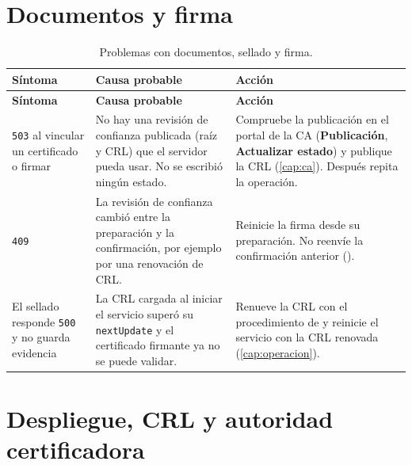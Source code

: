 \section{Documentos y firma}\label{sec:prob-documentos}

{\small
\begin{longtable}{L{3.7cm} L{4.6cm} L{7.1cm}}
  \caption{Problemas con documentos, sellado y firma.}\label{tab:prob-documentos} \\
  \toprule
  \textbf{Síntoma} & \textbf{Causa probable} & \textbf{Acción} \\
  \midrule
  \endfirsthead
  \toprule
  \textbf{Síntoma} & \textbf{Causa probable} & \textbf{Acción} \\
  \midrule
  \endhead
  \bottomrule
  \endfoot
    \texttt{503}  al vincular un
      certificado o firmar
      & No hay una revisión de confianza publicada (raíz y CRL) que el
        servidor pueda usar. No se escribió ningún estado.
      & Compruebe la publicación en el portal de la CA
        (\textbf{Publicación}, \textbf{Actualizar estado}) y publique la CRL
        (\cref{cap:ca}). Después repita la operación. \\
    \texttt{409} 
      & La revisión de confianza cambió entre la preparación y la
        confirmación, por ejemplo por una renovación de CRL.
      & Reinicie la firma desde su preparación. No reenvíe la confirmación
        anterior (). \\
    El sellado responde \texttt{500} y no guarda evidencia
      & La CRL cargada al iniciar el servicio superó su \texttt{nextUpdate} y
        el certificado firmante ya no se puede validar.
      & Renueve la CRL con el procedimiento de
         y reinicie el servicio con la CRL
        renovada (\cref{cap:operacion}). \\
\end{longtable}}

\section{Despliegue, CRL y autoridad certificadora}\label{sec:prob-despliegue}


